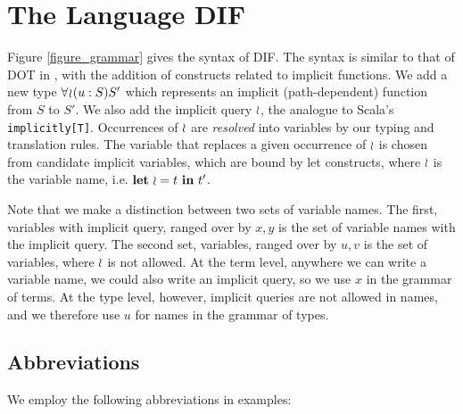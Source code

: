 \section{The Language DIF}
Figure \ref{figure_grammar} gives the syntax of DIF. The syntax is similar to
that of DOT in \cite{AGORS16}, with the addition of constructs related to
implicit functions. We add a new type $\forall\!\wr\!(u:S)S'$ which represents an
implicit (path-dependent) function from $S$ to $S'$. We also add the implicit
query $\wr$, the analogue to Scala's \texttt{implicitly[T]}. Occurrences of
$\wr$ are \emph{resolved} into variables by our typing and translation rules.
The variable that replaces a given occurrence of $\wr$ is chosen from
candidate implicit variables, which are bound by let constructs, where $\wr$
is the variable name, i.e. $\textbf{let}\ \wr = t\ \textbf{in}\ t'$.

Note that we make a distinction between two sets of variable names. The first,
variables with implicit query, ranged over by $x, y$ is the set of variable
names with the implicit query. The second set, variables, ranged over by $u, v$
is the set of variables, where $\wr$ is not allowed. At the term level,
anywhere we can write a variable name, we could also write an implicit query,
so we use $x$ in the grammar of terms. At the type level, however, implicit
queries are not allowed in names, and we therefore use $u$ for names in the
grammar of types.

\begin{figure*}[h]
    
    \caption{Grammar of DIF}
    \label{figure_grammar}
\end{figure*}

\subsection{Abbreviations}
We employ the following abbreviations in examples:

